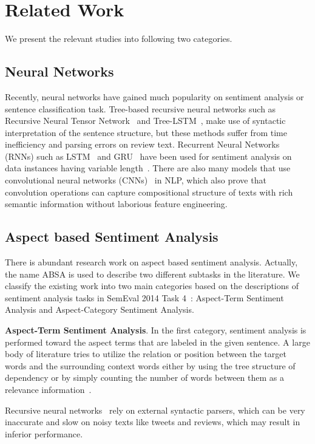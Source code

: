 \documentclass[11pt,a4paper]{article}
\begin{document}
\section{Related Work}
We present the relevant studies into following two categories.

\subsection{Neural Networks}
Recently, neural networks have gained much popularity on sentiment analysis or sentence classification task. Tree-based recursive neural networks such as Recursive Neural Tensor Network~\cite{Socher:2013ug} and Tree-LSTM~\cite{Tai:2015wp}, 
make use of syntactic interpretation of the sentence structure, but these methods suffer from time inefficiency and parsing errors on review text. 
Recurrent Neural Networks (RNNs) such as LSTM~\cite{Hochreiter:1997fq} and GRU~\cite{Chung:2014wf}
have been used for sentiment analysis on data instances having variable length~\cite{Tang:2015ts,Xu:2016vb,SiweiLai:2014to}.
There are also many models that use convolutional neural networks (CNNs)~\cite{Collobert:2011tk,Kalchbrenner:2014wl,Kim:2014vt,Conneau:2016to} in NLP, which also prove that convolution operations can capture compositional structure of texts with rich semantic information without laborious feature engineering.

\subsection{Aspect based Sentiment Analysis}
There is abundant research work on aspect based sentiment analysis. Actually, the name ABSA is used to describe two different subtasks in the literature. We classify the existing work into two main categories based on the descriptions of sentiment analysis tasks in SemEval 2014 Task 4~\cite{Pontiki:2014ex}: Aspect-Term Sentiment Analysis and Aspect-Category Sentiment Analysis.

\textbf{Aspect-Term Sentiment Analysis}. In the first category, sentiment analysis is performed toward the aspect terms that are labeled in the given sentence. A large body of literature tries to utilize the relation or position between the target words and the surrounding context words either by using the tree structure of dependency or by simply counting the number of words between them as a relevance information~\cite{Chen:2017wv}.

Recursive neural networks~\cite{Lakkaraju:2014vy,Dong:2014vd,Wang:2016vm} rely on external syntactic parsers, which can be very inaccurate and slow on noisy texts like tweets and reviews, which may result in inferior performance. 
\end{document}
